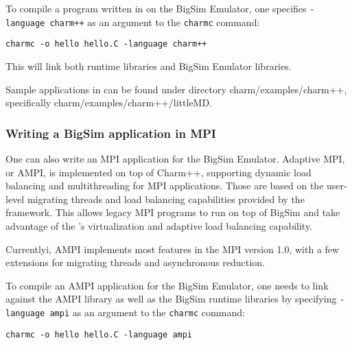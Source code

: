                  To compile a program written in \charmpp{} on the BigSim Emulator, one
specifies \texttt{-language charm++} as an argument to the {\tt charmc} command:
\begin{verbatim}
charmc -o hello hello.C -language charm++
\end{verbatim}
        This will link both \charmpp{} runtime libraries and BigSim Emulator
libraries.

Sample applications in \charmpp{} can be found under directory
        charm/examples/charm++, specifically charm/examples/charm++/littleMD.

        \subsubsection{Writing a BigSim application in MPI}

        One can also write an MPI application for the BigSim Emulator.
            Adaptive MPI, or AMPI, is implemented on top of Charm++, supporting
        dynamic load balancing and multithreading for MPI applications. Those are based
on the user-level migrating threads and load balancing capabilities provided
by the \charmpp{} framework. This allows legacy MPI programs to run 
        on top of BigSim \charmpp{} and take advantage of the \charmpp{}'s
virtualization and adaptive load balancing capability.

        Currentlyi, AMPI implements most features in the MPI version 1.0, with a few
extensions for migrating threads and asynchronous reduction.

                 To compile an AMPI application for the BigSim Emulator, one needs
        to link against the AMPI library as well as the BigSim \charmpp{} runtime
libraries by specifying \texttt{-language ampi} as an argument to 
        the {\tt charmc} command:
\begin{verbatim}
charmc -o hello hello.C -language ampi
\end{verbatim}

